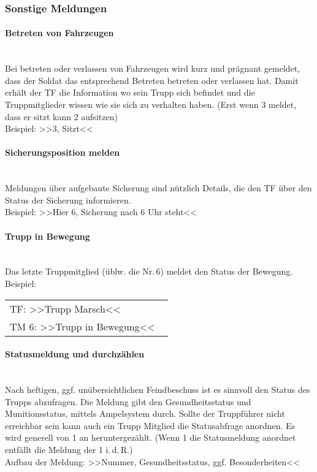 \subsubsection{Sonstige Meldungen}
	\paragraph*{Betreten von Fahrzeugen}\hfil\\
	\label{para:fahrzeug-betreten}
	Bei betreten oder verlassen von Fahrzeugen wird kurz und prägnant gemeldet, dass der Soldat das entsprechend Betreten betreten oder verlassen hat. Damit erhält der TF die Information wo sein Trupp sich befindet und die Truppmitglieder wissen wie sie sich zu verhalten haben. (Erst wenn 3 meldet, dass er sitzt kann 2 aufsitzen)\\
	Beispiel: >>3, Sitzt<<

	\paragraph*{Sicherungsposition melden}\hfil\\
	Meldungen über aufgebaute Sicherung sind nützlich Details, die den TF über den Status der Sicherung informieren. \\
	Beispiel: >>Hier 6, Sicherung nach 6 Uhr steht<<

	\paragraph*{Trupp in Bewegung}\hfil\\
	Das letzte Truppmitglied (üblw. die Nr.\,6) meldet den Status der Bewegung.\\
	Beispiel: \\
	\begin{longtable}{P{0.95\linewidth}}
	\toprule
	TF: >>Trupp Marsch<<\\
	\rcg TM 6: >>Trupp in Bewegung<<\\
	\bottomrule
	\end{longtable}		
	

	\paragraph*{Statusmeldung und durchzählen}\hfil\\
	\label{sec:Status}
	Nach heftigen, ggf. unübersichtlichen Feindbeschuss ist es sinnvoll den Status des Trupps abzufragen. Die Meldung gibt den Gesundheitsstatus und Munitionsstatus, mittels Ampelsystem durch. Sollte der Truppführer nicht erreichbar sein kann auch ein Trupp Mitglied die Statusabfrage anordnen.
	Es wird generell von 1 an heruntergezählt. (Wenn 1 die Statusmeldung anordnet entfällt die Meldung der 1 i.\,d.\,R.)  \\
	Aufbau der Meldung: >>Nummer, Gesundheitsstatus, ggf. Besonderheiten<<\\
	
